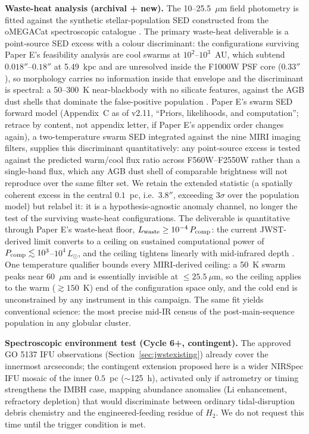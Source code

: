 \documentclass[11pt]{article}
\begin{document}
\textbf{Waste-heat analysis (archival + new).} The 10--25.5~$\mu$m field photometry is fitted against the synthetic stellar-population SED constructed from the oMEGACat spectroscopic catalogue \citep{Nitschai2023}. The primary waste-heat deliverable is a point-source SED excess with a colour discriminant: the configurations surviving Paper E's feasibility analysis are cool swarms at $10^{2}$--$10^{3}$~AU, which subtend $0.018''$--$0.18''$ at 5.49~kpc and are unresolved inside the F1000W PSF core ($0.33''$), so morphology carries no information inside that envelope and the discriminant is spectral: a 50--300~K near-blackbody with no silicate features, against the AGB dust shells that dominate the false-positive population \citep{Swanson2026Engineered}. Paper E's swarm SED forward model (Appendix~C as of v2.11, ``Priors, likelihoods, and computation''; retrace by content, not appendix letter, if Paper E's appendix order changes again), a two-temperature swarm SED integrated against the nine MIRI imaging filters, supplies this discriminant quantitatively: any point-source excess is tested against the predicted warm/cool flux ratio across F560W--F2550W rather than a single-band flux, which any AGB dust shell of comparable brightness will not reproduce over the same filter set. We retain the extended statistic (a spatially coherent excess in the central $0.1$~pc, i.e.\ $3.8''$, exceeding $3\sigma$ over the population model) but relabel it: it is a hypothesis-agnostic anomaly channel, no longer the test of the surviving waste-heat configurations. The deliverable is quantitative through Paper E's waste-heat floor, $L_{\rm waste} \geq 10^{-4}\,P_{\rm comp}$: the current JWST-derived limit converts to a ceiling on sustained computational power of $P_{\rm comp} \lesssim 10^{3}$--$10^{4}\,L_\odot$, and the ceiling tightens linearly with mid-infrared depth \citep{Swanson2026Engineered}. One temperature qualifier bounds every MIRI-derived ceiling: a 50~K swarm peaks near 60~$\mu$m and is essentially invisible at $\leq 25.5~\mu$m, so the ceiling applies to the warm ($\gtrsim 150$~K) end of the configuration space only, and the cold end is unconstrained by any instrument in this campaign. The same fit yields conventional science: the most precise mid-IR census of the post-main-sequence population in any globular cluster.

\textbf{Spectroscopic environment test (Cycle 6+, contingent).} The approved GO 5137 IFU observations (Section~\ref{sec:jwstexisting}) already cover the innermost arcseconds; the contingent extension proposed here is a wider NIRSpec IFU mosaic of the inner $0.5$~pc ($\sim$125~h), activated only if astrometry or timing strengthens the IMBH case, mapping abundance anomalies (Li enhancement, refractory depletion) that would discriminate between ordinary tidal-disruption debris chemistry \citep{Hills1988,Gezari2021} and the engineered-feeding residue of $H_2$. We do not request this time until the trigger condition is met.
\end{document}
